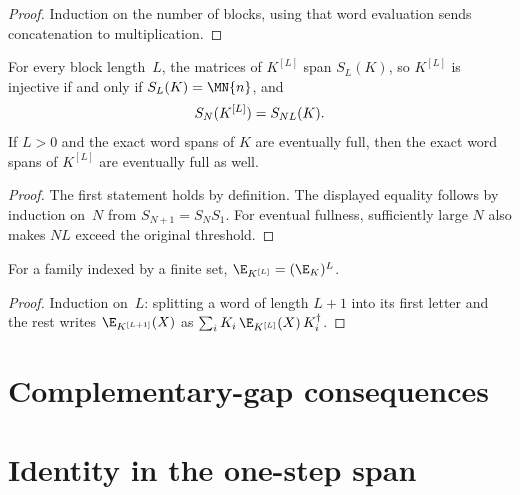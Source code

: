 \begin{proof}\leanok
    Induction on the number of blocks, using that word evaluation sends
    concatenation to multiplication.
\end{proof}

\begin{theorem}
    \label{thm:kraus_blocking_word_span}
    \leanok
    For every block length~$L$, the matrices of $K^{[L]}$ span $S_L(K)$, so
    $K^{[L]}$ is injective if and only if $S_L(K)=\MN{n}$, and
    \begin{align}
        S_N(K^{[L]})=S_{NL}(K).
        \notag
    \end{align}
    If $L>0$ and the exact word spans of $K$ are eventually full, then the
    exact word spans of $K^{[L]}$ are eventually full as well.
\end{theorem}

\begin{proof}\leanok
    The first statement holds by definition. The displayed equality follows by
    induction on~$N$ from $S_{N+1}=S_N S_1$. For eventual fullness,
    sufficiently large $N$ also makes $NL$ exceed the original threshold.
\end{proof}

\begin{theorem}
    \label{thm:kraus_transfer_map_block}
    \leanok
    For a family indexed by a finite set, $\E_{K^{[L]}}=(\E_K)^L$.
\end{theorem}

\begin{proof}\leanok
    Induction on~$L$: splitting a word of length $L+1$ into its first letter
    and the rest writes $\E_{K^{[L+1]}}(X)$ as
    $\sum_i K_i\,\E_{K^{[L]}}(X)\,K_i^\dagger$.
\end{proof}

\section{Complementary-gap consequences}
\label{sec:app_wielandt_complementary_gap}

\section{Identity in the one-step span}
\label{sec:app_wielandt_identity_in_span}

